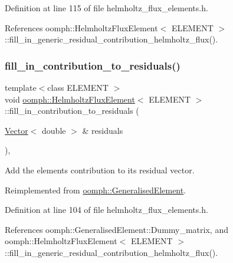 Definition at line 115 of file helmholtz\+\_\+flux\+\_\+elements.\+h.



References oomph\+::\+Helmholtz\+Flux\+Element$<$ E\+L\+E\+M\+E\+N\+T $>$\+::fill\+\_\+in\+\_\+generic\+\_\+residual\+\_\+contribution\+\_\+helmholtz\+\_\+flux().

\mbox{\label{classoomph_1_1HelmholtzFluxElement_a861a3825432d2ddc1b0e2deff79ed0bc}} 
\subsubsection{\texorpdfstring{fill\+\_\+in\+\_\+contribution\+\_\+to\+\_\+residuals()}{fill\_in\_contribution\_to\_residuals()}}
{\footnotesize\ttfamily template$<$class E\+L\+E\+M\+E\+NT $>$ \\
void \hyperlink{classoomph_1_1HelmholtzFluxElement}{oomph\+::\+Helmholtz\+Flux\+Element}$<$ E\+L\+E\+M\+E\+NT $>$\+::fill\+\_\+in\+\_\+contribution\+\_\+to\+\_\+residuals (\begin{DoxyParamCaption}\item[{\hyperlink{classoomph_1_1Vector}{Vector}$<$ double $>$ \&}]{residuals }\end{DoxyParamCaption})\hspace{0.3cm}{\ttfamily [inline]}, {\ttfamily [virtual]}}



Add the element\textquotesingle{}s contribution to its residual vector. 



Reimplemented from \hyperlink{classoomph_1_1GeneralisedElement_a310c97f515e8504a48179c0e72c550d7}{oomph\+::\+Generalised\+Element}.



Definition at line 104 of file helmholtz\+\_\+flux\+\_\+elements.\+h.



References oomph\+::\+Generalised\+Element\+::\+Dummy\+\_\+matrix, and oomph\+::\+Helmholtz\+Flux\+Element$<$ E\+L\+E\+M\+E\+N\+T $>$\+::fill\+\_\+in\+\_\+generic\+\_\+residual\+\_\+contribution\+\_\+helmholtz\+\_\+flux().

